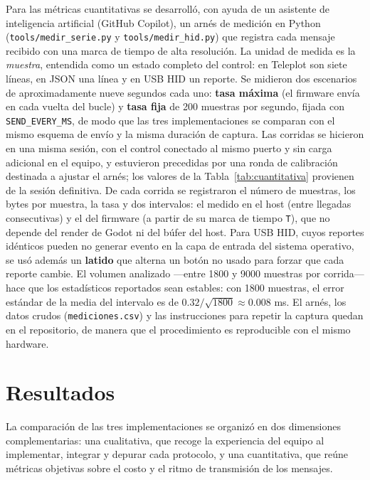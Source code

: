 \documentclass[journal]{IEEEtran}
\begin{document}
Para las métricas cuantitativas se desarrolló, con ayuda de un asistente de inteligencia artificial (GitHub Copilot), un arnés de medición en Python (\texttt{tools/\allowbreak medir\_\allowbreak serie.py} y \texttt{tools/\allowbreak medir\_\allowbreak hid.py}) que registra cada mensaje recibido con una marca de tiempo de alta resolución. La unidad de medida es la \textit{muestra}, entendida como un estado completo del control: en Teleplot son siete líneas, en JSON una línea y en USB HID un reporte. Se midieron dos escenarios de aproximadamente nueve segundos cada uno: \textbf{tasa máxima} (el firmware envía en cada vuelta del bucle) y \textbf{tasa fija} de 200 muestras por segundo, fijada con \texttt{SEND\_EVERY\_MS}, de modo que las tres implementaciones se comparan con el mismo esquema de envío y la misma duración de captura. Las corridas se hicieron en una misma sesión, con el control conectado al mismo puerto y sin carga adicional en el equipo, y estuvieron precedidas por una ronda de calibración destinada a ajustar el arnés; los valores de la Tabla~\ref{tab:cuantitativa} provienen de la sesión definitiva. De cada corrida se registraron el número de muestras, los bytes por muestra, la tasa y dos intervalos: el medido en el host (entre llegadas consecutivas) y el del firmware (a partir de su marca de tiempo \texttt{T}), que no depende del render de Godot ni del búfer del host. Para USB HID, cuyos reportes idénticos pueden no generar evento en la capa de entrada del sistema operativo, se usó además un \textbf{latido} que alterna un botón no usado para forzar que cada reporte cambie. El volumen analizado ---entre 1800 y 9000 muestras por corrida--- hace que los estadísticos reportados sean estables: con 1800 muestras, el error estándar de la media del intervalo es de $0.32/\sqrt{1800} \approx 0.008$ ms. El arnés, los datos crudos (\texttt{mediciones.csv}) y las instrucciones para repetir la captura quedan en el repositorio, de manera que el procedimiento es reproducible con el mismo hardware.


\section{Resultados}

La comparación de las tres implementaciones se organizó en dos dimensiones complementarias: una cualitativa, que recoge la experiencia del equipo al implementar, integrar y depurar cada protocolo, y una cuantitativa, que reúne métricas objetivas sobre el costo y el ritmo de transmisión de los mensajes.
\end{document}
